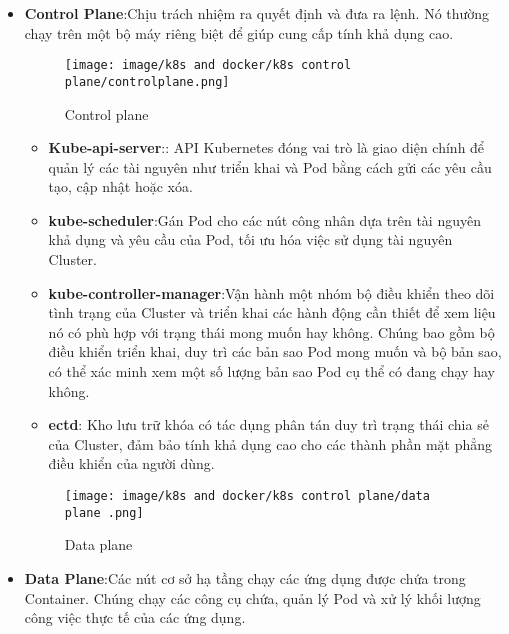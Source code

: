 \documentclass[a4paper,12pt]{article}
\begin{document}
\begin{itemize}
    \item \textbf{Control Plane}:Chịu trách nhiệm ra quyết định và đưa ra lệnh. Nó thường chạy trên một bộ máy riêng biệt để giúp cung cấp tính khả dụng cao.


    \begin{figure}[htbp]
    \centering
    \texttt{[image: image/k8s and docker/k8s control plane/controlplane.png]}
    \caption{Control plane}
    \label{}
    \end{figure}




    
    \begin{itemize}
        \item \textbf{Kube-api-server}:: API Kubernetes đóng vai trò là giao diện chính để quản lý các tài nguyên
như triển khai và Pod bằng cách gửi các yêu cầu tạo, cập nhật hoặc xóa.
        \item \textbf{kube-scheduler}:Gán Pod cho các nút công nhân dựa trên tài nguyên khả dụng và yêu cầu
của Pod, tối ưu hóa việc sử dụng tài nguyên Cluster.
        \item \textbf{kube-controller-manager}:Vận hành một nhóm bộ điều khiển theo dõi tình trạng
của Cluster và triển khai các hành động cần thiết để xem liệu nó có phù hợp với trạng thái mong muốn hay
không. Chúng bao gồm bộ điều khiển triển khai, duy trì các bản sao Pod mong muốn và bộ bản sao, có thể
xác minh xem một số lượng bản sao Pod cụ thể có đang chạy hay không.
        \item \textbf{ectd}: Kho lưu trữ khóa có tác dụng phân tán duy trì trạng thái chia sẻ của Cluster, đảm bảo tính khả dụng cao
cho các thành phần mặt phẳng điều khiển của người dùng.
    \end{itemize}




\begin{figure}[htbp]
    \centering
    \texttt{[image: image/k8s and docker/k8s control plane/data plane .png]}
    \caption{Data plane}
    \label{}
\end{figure}




    
    \item \textbf{Data Plane}:Các nút cơ sở hạ tầng chạy các ứng dụng được chứa trong Container. Chúng chạy
các công cụ chứa, quản lý Pod và xử lý khối lượng công việc thực tế của các ứng dụng.













\end{itemize}
\end{document}
